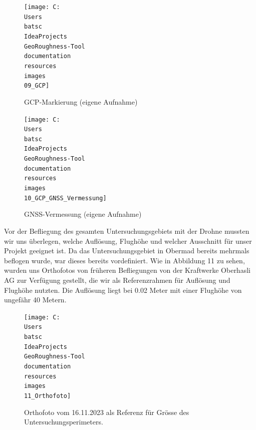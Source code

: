 \documentclass[12pt]{article}
\begin{document}
        \begin{minipage}{.45\textwidth}
            \begin{figure}
                \centering
                \texttt{[image: C:\\Users\\batsc\\IdeaProjects\\GeoRoughness-Tool\\documentation\\resources\\images\\09\_GCP]}
                \caption{GCP-Markierung (eigene Aufnahme)}
                \label{fig:09_gcp}
            \end{figure}
        \end{minipage}
        \hfill
        \begin{minipage}{.45\textwidth}
            \begin{figure}
                \centering
                \texttt{[image: C:\\Users\\batsc\\IdeaProjects\\GeoRoughness-Tool\\documentation\\resources\\images\\10\_GCP\_GNSS\_Vermessung]}
                \caption{GNSS-Vermessung (eigene Aufnahme)}
                \label{fig:10_gcp_gnss_vermessung}
            \end{figure}
        \end{minipage}

        Vor der Befliegung des gesamten Untersuchungsgebiets mit der Drohne mussten wir uns überlegen, welche Auflösung, Flughöhe und welcher Ausschnitt für unser Projekt geeignet ist.
        Da das Untersuchungsgebiet in Obermad bereits mehrmals beflogen wurde, war dieses bereits vordefiniert.
        Wie in Abbildung 11 zu sehen, wurden uns Orthofotos von früheren Befliegungen von der Kraftwerke Oberhasli AG zur Verfügung gestellt, die wir als Referenzrahmen für Auflösung und Flughöhe nutzten. %
        Die Auflösung liegt bei 0.02 Meter mit einer Flughöhe von ungefähr 40 Metern.

        \begin{figure}
            \centering
            \texttt{[image: C:\\Users\\batsc\\IdeaProjects\\GeoRoughness-Tool\\documentation\\resources\\images\\11\_Orthofoto]}
            \caption{Orthofoto vom 16.11.2023 als Referenz für Grösse des Untersuchungsperimeters.}
            \label{fig:11_orthofoto}
        \end{figure}
\end{document}
